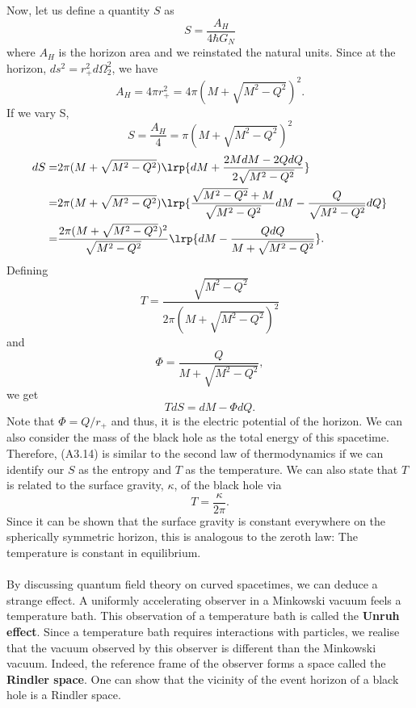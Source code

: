     Now, let us define a quantity $S$ as
    \begin{equation}
        S = \frac{A_H}{4\hbar G_N}
    \end{equation}
    where $A_H$ is the horizon area and we reinstated the natural units. Since at the horizon, $ds^2 = r_+^2d\Omega_2^2$, we have
    \begin{equation}
        A_H = 4\pi r_+^2 = 4\pi(M+\sqrt{M^2-Q^2})^2.
    \end{equation}
    If we vary S,
    \begin{equation}
        S = \frac{A_H}{4} = \pi(M+\sqrt{M^2-Q^2})^2
    \end{equation}
    \begin{align}
        dS =& 2\pi(M+\sqrt{M^2-Q^2})\lrp{dM + \frac{2MdM-2QdQ}{2\sqrt{M^2-Q^2}}}\notag \\ 
           =& 2\pi(M+\sqrt{M^2-Q^2})\lrp{\frac{\sqrt{M^2-Q^2}+M}{\sqrt{M^2-Q^2}}dM-\frac{Q}{\sqrt{M^2-Q^2}}dQ}\notag \\
           =& \frac{2\pi(M+\sqrt{M^2-Q^2})^2}{\sqrt{M^2-Q^2}}\lrp{dM-\frac{QdQ}{M+\sqrt{M^2-Q^2}}}.
    \end{align}
    Defining
    \begin{equation}
        T = \frac{\sqrt{M^2-Q^2}}{2\pi(M+\sqrt{M^2-Q^2})^2}
    \end{equation}
    and 
    \begin{equation}
        \Phi = \frac{Q}{M+\sqrt{M^2-Q^2}},
    \end{equation}
    we get
    \begin{equation}
        TdS = dM - \Phi dQ.
    \end{equation}
    Note that $\Phi = Q/r_+$ and thus, it is the electric potential of the horizon. We can also consider the mass of the black hole as the total energy of this spacetime. Therefore, (A3.14) is similar to the second law of thermodynamics if we can identify our $S$ as the entropy and $T$ as the temperature. We can also state that $T$ is related to the surface gravity, $\kappa$, of the black hole via
    \begin{equation}
        T = \frac{\kappa}{2\pi}.
    \end{equation} 
    Since it can be shown that the surface gravity is constant everywhere on the spherically symmetric horizon, this is analogous to the zeroth law: The temperature is constant in equilibrium. \\
    \\
    By discussing quantum field theory on curved spacetimes, we can deduce a strange effect. A uniformly accelerating observer in a Minkowski vacuum feels a temperature bath. This observation of a temperature bath is called the \textbf{Unruh effect}. Since a temperature bath requires interactions with particles, we realise that the vacuum observed by this observer is different than the Minkowski vacuum. Indeed, the reference frame of the observer forms a space called the \textbf{Rindler space}. One can show that the vicinity of the event horizon of a black hole is a Rindler space. \\
